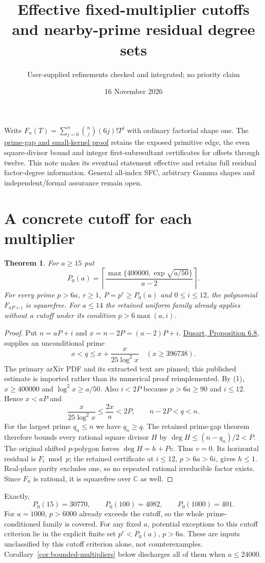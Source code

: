\documentclass[11pt]{article}
\title{Effective fixed-multiplier cutoffs and nearby-prime residual degree sets}
\author{User-supplied refinements checked and integrated; no priority claim}
\date{16 November 2026}
\newtheorem{theorem}{Theorem}
\newcommand{\C}{\mathbb C}
\begin{document}
\maketitle
Write $F_n(T)=\sum_{j=0}^n\binom nj(6j)!T^j$ with ordinary factorial
shape one. The \href{PRIME_GAPS_AND_SMALL_KERNELS.tex}{prime-gap and
small-kernel proof} retains the exposed primitive edge, the even
square-divisor bound and integer first-subresultant certificates for
offsets through twelve. This note makes its eventual statement effective
and retains full residual factor-degree information. General all-index
SFC, arbitrary Gamma shapes and independent/formal assurance remain open.

\section{A concrete cutoff for each multiplier}
\begin{theorem}\label{thm:cutoff}
For $a\ge15$ put
\[
 P_0(a)=\left\lceil
 \frac{\max\{400000,\exp\sqrt{a/50}\}}{a-2}\right\rceil. \tag{1}
\]
For every prime $p>6a$, $r\ge1$, $P=p^r\ge P_0(a)$ and
$0\le i\le12$, the polynomial $F_{aP+i}$ is squarefree.
For $a\le14$ the retained uniform family already applies without a
cutoff under its condition $p>6\max(a,i)$.
\end{theorem}
\begin{proof}
Put $n=aP+i$ and $x=n-2P=(a-2)P+i$.
\href{sources/dusart-1002.0442.pdf}{Dusart, Proposition 6.8}, supplies
an unconditional prime
\[
 x<q\le x+\frac{x}{25\log^2x}\quad(x\ge396738).
\]
The primary arXiv PDF and its extracted text are pinned; this published
estimate is imported rather than its numerical proof reimplemented.
By (1), $x\ge400000$ and $\log^2x\ge a/50$. Also $i<2P$ because
$p>6a\ge90$ and $i\le12$. Hence $x<aP$ and
\[
 \frac{x}{25\log^2x}\le\frac{2x}{a}<2P,
 \qquad n-2P<q<n. \tag{2}
\]
For the largest prime $q_n\le n$ we have $q_n\ge q$.
The retained prime-gap theorem therefore bounds every rational square
divisor $H$ by $\deg H\le(n-q_n)/2<P$.
The original shifted $p$-polygon forces $\deg H=h+Pv$.
Thus $v=0$. Its horizontal residual is $F_i\bmod p$; the retained
certificate at $i\le12$, $p>6a>6i$, gives $h\le1$.
Real-place parity excludes one, so no repeated rational irreducible
factor exists. Since $F_n$ is rational, it is squarefree over $\C$ as well.
\end{proof}

Exactly,
\[
 P_0(15)=30770,\qquad P_0(100)=4082,\qquad P_0(1000)=401. \tag{3}
\]
For $a=1000$, $p>6000$ already exceeds the cutoff, so the whole
prime-conditioned family is covered. For any fixed $a$, potential
exceptions to this cutoff criterion lie in the explicit finite set
$p^r<P_0(a)$, $p>6a$. These are inputs unclassified by this cutoff
criterion alone, not counterexamples. Corollary~\ref{cor:bounded-multipliers}
below discharges all of them when $a\le24000$.
\end{document}
